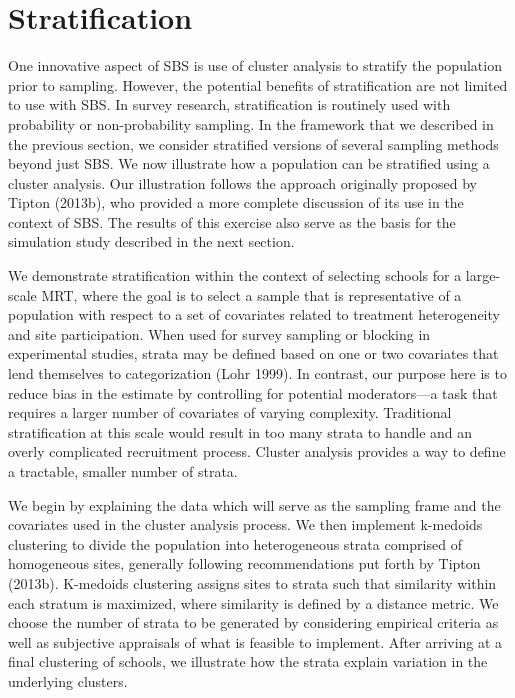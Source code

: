 \documentclass[
  english,
  man,floatsintext]{apa6}
\begin{document}

\hypertarget{stratification}{%
\section{Stratification}\label{stratification}}

One innovative aspect of SBS is use of cluster analysis to stratify the population prior to sampling. However, the potential benefits of stratification are not limited to use with SBS. In survey research, stratification is routinely used with probability or non-probability sampling. In the framework that we described in the previous section, we consider stratified versions of several sampling methods beyond just SBS. We now illustrate how a population can be stratified using a cluster analysis. Our illustration follows the approach originally proposed by Tipton (2013b), who provided a more complete discussion of its use in the context of SBS.
The results of this exercise also serve as the basis for the simulation study described in the next section.

We demonstrate stratification within the context of selecting schools for a large-scale MRT, where the goal is to select a sample that is representative of a population with respect to a set of covariates related to treatment heterogeneity and site participation. When used for survey sampling or blocking in experimental studies, strata may be defined based on one or two covariates that lend themselves to categorization (Lohr 1999). In contrast, our purpose here is to reduce bias in the estimate by controlling for potential moderators---a task that requires a larger number of covariates of varying complexity. Traditional stratification at this scale would result in too many strata to handle and an overly complicated recruitment process. Cluster analysis provides a way to define a tractable, smaller number of strata.

We begin by explaining the data which will serve as the sampling frame and the covariates used in the cluster analysis process. We then implement k-medoids clustering to divide the population into heterogeneous strata comprised of homogeneous sites, generally following recommendations put forth by Tipton (2013b). K-medoids clustering assigns sites to strata such that similarity within each stratum is maximized, where similarity is defined by a distance metric. We choose the number of strata to be generated by considering empirical criteria as well as subjective appraisals of what is feasible to implement. After arriving at a final clustering of schools, we illustrate how the strata explain variation in the underlying clusters.
\end{document}
